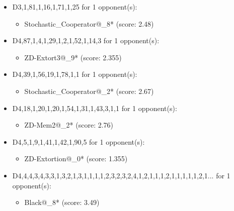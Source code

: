 \begin{appendices}
\begin{itemize}
    \item D3,1,81,1,16,1,71,1,25 for 1 opponent(s):
    \begin{multicols}{3}
         \begin{itemize}
            \item Stochastic\_Cooperator@\_8* (score: 2.48)
        \end{itemize}
     \end{multicols}
     
    \item D4,87,1,4,1,29,1,2,1,52,1,14,3 for 1 opponent(s):
    \begin{multicols}{3}
         \begin{itemize}
            \item ZD-Extort3@\_9* (score: 2.355)
        \end{itemize}
     \end{multicols}
     
    \item D4,39,1,56,19,1,78,1,1 for 1 opponent(s):
    \begin{multicols}{3}
         \begin{itemize}
            \item Stochastic\_Cooperator@\_2* (score: 2.67)
        \end{itemize}
     \end{multicols}
     
    \item D4,18,1,20,1,20,1,54,1,31,1,43,3,1,1 for 1 opponent(s):
    \begin{multicols}{3}
         \begin{itemize}
            \item ZD-Mem2@\_2* (score: 2.76)
        \end{itemize}
     \end{multicols}
     
    \item D4,5,1,9,1,41,1,42,1,90,5 for 1 opponent(s):
    \begin{multicols}{3}
         \begin{itemize}
            \item ZD-Extortion@\_0* (score: 1.355)
        \end{itemize}
     \end{multicols}
     
    \item D4,4,4,3,4,3,3,1,3,2,1,3,1,1,1,1,2,3,2,3,2,4,1,2,1,1,1,2,1,1,1,1,1,2,1... for 1 opponent(s):
    \begin{multicols}{3}
         \begin{itemize}
            \item Black@\_8* (score: 3.49)
        \end{itemize}
     \end{multicols}
     

\end{itemize}
\end{appendices}
